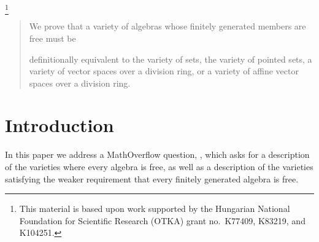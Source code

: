 \author{Keith A. Kearnes}
\address[Keith Kearnes]{Department of Mathematics\\
University of Colorado\\
Boulder, CO 80309-0395\\
USA}
\author{Emil W. Kiss}
\address[Emil W. Kiss]{
Lor\'{a}nd E{\"o}tv{\"o}s University\\
Department of Algebra and Number Theory\\
H--1117 Budapest, P\'{a}zm\'{a}ny P\'{e}ter s\'{e}t\'{a}ny 1/c.\\
Hungary}
\author{\'Agnes Szendrei}
\address[\'Agnes Szendrei]{Department of Mathematics\\
University of Colorado\\
Boulder, CO 80309-0395\\
USA}
\thanks{This material is based upon work supported by
the Hungarian National Foundation for Scientific Research (OTKA)
grant no.\ K77409, K83219, and K104251.
}
\keywords{}

\begin{abstract}
  We prove that a
  variety of algebras whose finitely
  generated members are free
  must be
  
  definitionally equivalent to
  the variety of sets, the variety of pointed sets, a variety of vector spaces
  over a division ring, or a variety of affine vector spaces over a
  division ring.
\end{abstract}

\maketitle

\section{Introduction}\label{intro_sec}
In this paper we address a MathOverflow question, \cite{campion},
which asks for a description of the varieties
where every algebra is free, as well as a description of the varieties
satisfying the weaker requirement that
every finitely generated algebra is free.

